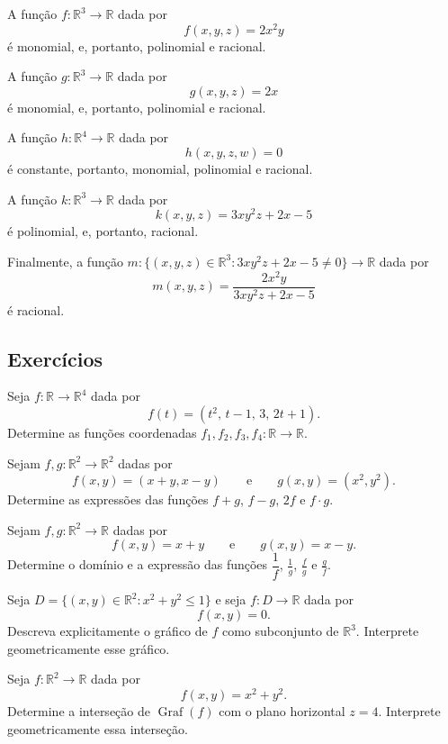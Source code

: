 \begin{example}
    A função $f:\mathbb R^3\to\mathbb R$ dada por
    \[
        f(x,y,z)=2x^2y
    \]
    é monomial, e, portanto, polinomial e racional.

    A função $g:\mathbb R^3\to\mathbb R$ dada por
    \[
        g(x,y,z)=2x
    \]
    é monomial, e, portanto, polinomial e racional.

    A função $h:\mathbb R^4\to\mathbb R$ dada por
    \[
        h(x,y,z,w)=0
    \]
    é constante, portanto, monomial, polinomial e racional.

    A função $k:\mathbb R^3\to\mathbb R$ dada por
    \[
        k(x,y,z)=3xy^2z+2x-5
    \]
    é polinomial, e, portanto, racional.

    Finalmente, a função $m:\{(x, y, z)\in\mathbb R^3:3xy^2z+2x-5\neq 0\}\to\mathbb R$ dada por
    \[
        m(x,y,z)=\frac{2x^2y}{3xy^2z+2x-5}
    \]
    é racional.
\end{example}
\subsection*{Exercícios}

\begin{exercise}
    Seja $f:\mathbb R\to\mathbb R^4$ dada por
    \[
        f(t)=(t^2,\, t-1,\, 3,\, 2t+1).
    \]
    Determine as funções coordenadas $f_1,f_2,f_3,f_4:\mathbb R\to\mathbb R$.
\end{exercise}

\begin{exercise}
    Sejam $f,g:\mathbb R^2\to\mathbb R^2$ dadas por
    \[
        f(x,y)=(x+y,x-y)
        \qquad\text{e}\qquad
        g(x,y)=(x^2,y^2).
    \]
    Determine as expressões das funções $f+g$, $f-g$, $2f$ e $f\cdot g$.
\end{exercise}

\begin{exercise}
    Sejam $f,g:\mathbb R^2\to\mathbb R$ dadas por
    \[
        f(x,y)=x+y
        \qquad\text{e}\qquad
        g(x,y)=x-y.
    \]
    Determine o domínio e a expressão das funções $\dfrac{1}{f}$, $\frac{1}{g}$, $\frac{f}{g}$ e $\frac{g}{f}$.
\end{exercise}

\begin{exercise}
    Seja $D=\{(x,y)\in\mathbb R^2:x^2+y^2\leq 1\}$ e seja $f:D\to\mathbb R$ dada por
    \[
        f(x,y)=0.
    \]
    Descreva explicitamente o gráfico de $f$ como subconjunto de $\mathbb R^3$.
    Interprete geometricamente esse gráfico.
\end{exercise}

\begin{exercise}
    Seja $f:\mathbb R^2\to\mathbb R$ dada por
    \[
        f(x,y)=x^2+y^2.
    \]
    Determine a interseção de $\operatorname{Graf}(f)$ com o plano horizontal $z=4$.
    Interprete geometricamente essa interseção.
\end{exercise}